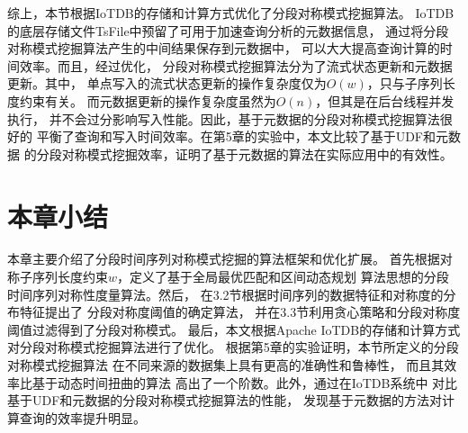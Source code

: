 综上，本节根据IoTDB的存储和计算方式优化了分段对称模式挖掘算法。
IoTDB的底层存储文件TsFile中预留了可用于加速查询分析的元数据信息，
通过将分段对称模式挖掘算法产生的中间结果保存到元数据中，
可以大大提高查询计算的时间效率。而且，经过优化，
分段对称模式挖掘算法分为了流式状态更新和元数据更新。其中，
单点写入的流式状态更新的操作复杂度仅为$O(w)$，只与子序列长度约束有关。
而元数据更新的操作复杂度虽然为$O(n)$，但其是在后台线程并发执行，
并不会过分影响写入性能。因此，基于元数据的分段对称模式挖掘算法很好的
平衡了查询和写入时间效率。在第5章的实验中，本文比较了基于UDF和元数据
的分段对称模式挖掘效率，证明了基于元数据的算法在实际应用中的有效性。


\section{本章小结}
本章主要介绍了分段时间序列对称模式挖掘的算法框架和优化扩展。
首先根据对称子序列长度约束$w$，定义了基于全局最优匹配和区间动态规划
算法思想的分段时间序列对称性度量算法。然后，
在3.2节根据时间序列的数据特征和对称度的分布特征提出了
分段对称度阈值的确定算法，
并在3.3节利用贪心策略和分段对称度阈值过滤得到了分段对称模式。
最后，本文根据Apache IoTDB的存储和计算方式
对分段对称模式挖掘算法进行了优化。
根据第5章的实验证明，本节所定义的分段对称模式挖掘算法
在不同来源的数据集上具有更高的准确性和鲁棒性，
而且其效率比基于动态时间扭曲的算法
高出了一个阶数。此外，通过在IoTDB系统中
对比基于UDF和元数据的分段对称模式挖掘算法的性能，
发现基于元数据的方法对计算查询的效率提升明显。






